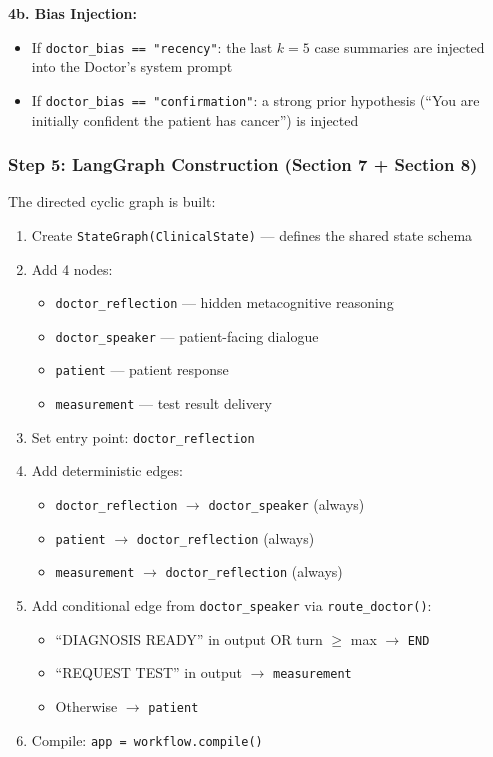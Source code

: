 \textbf{4b. Bias Injection:}
\begin{itemize}
    \item If \texttt{doctor\_bias == "recency"}: the last $k=5$ case summaries are injected into the Doctor's system prompt
    \item If \texttt{doctor\_bias == "confirmation"}: a strong prior hypothesis (``You are initially confident the patient has cancer'') is injected
\end{itemize}

\subsubsection{Step 5: LangGraph Construction (Section 7 + Section 8)}

\begin{acadbox}[\textcolor{white}{What Happens}]
The directed cyclic graph is built:
\begin{enumerate}
    \item Create \texttt{StateGraph(ClinicalState)} --- defines the shared state schema
    \item Add 4 nodes:
    \begin{itemize}
        \item \texttt{doctor\_reflection} --- hidden metacognitive reasoning
        \item \texttt{doctor\_speaker} --- patient-facing dialogue
        \item \texttt{patient} --- patient response
        \item \texttt{measurement} --- test result delivery
    \end{itemize}
    \item Set entry point: \texttt{doctor\_reflection}
    \item Add deterministic edges:
    \begin{itemize}
        \item \texttt{doctor\_reflection} $\rightarrow$ \texttt{doctor\_speaker} (always)
        \item \texttt{patient} $\rightarrow$ \texttt{doctor\_reflection} (always)
        \item \texttt{measurement} $\rightarrow$ \texttt{doctor\_reflection} (always)
    \end{itemize}
    \item Add conditional edge from \texttt{doctor\_speaker} via \texttt{route\_doctor()}:
    \begin{itemize}
        \item ``DIAGNOSIS READY'' in output OR turn $\geq$ max $\rightarrow$ \texttt{END}
        \item ``REQUEST TEST'' in output $\rightarrow$ \texttt{measurement}
        \item Otherwise $\rightarrow$ \texttt{patient}
    \end{itemize}
    \item Compile: \texttt{app = workflow.compile()}
\end{enumerate}
\end{acadbox}

